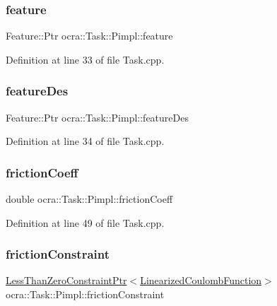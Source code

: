 \subsubsection{\texorpdfstring{feature}{feature}}
{\footnotesize\ttfamily Feature\+::\+Ptr ocra\+::\+Task\+::\+Pimpl\+::feature}



Definition at line 33 of file Task.\+cpp.

\hypertarget{structocra_1_1Task_1_1Pimpl_aeaa68d51952ea53355e2f8789b691174}{}\label{structocra_1_1Task_1_1Pimpl_aeaa68d51952ea53355e2f8789b691174} 
\subsubsection{\texorpdfstring{feature\+Des}{featureDes}}
{\footnotesize\ttfamily Feature\+::\+Ptr ocra\+::\+Task\+::\+Pimpl\+::feature\+Des}



Definition at line 34 of file Task.\+cpp.

\hypertarget{structocra_1_1Task_1_1Pimpl_ad241160e0a892b49ecee3ea6a4b68bca}{}\label{structocra_1_1Task_1_1Pimpl_ad241160e0a892b49ecee3ea6a4b68bca} 
\subsubsection{\texorpdfstring{friction\+Coeff}{frictionCoeff}}
{\footnotesize\ttfamily double ocra\+::\+Task\+::\+Pimpl\+::friction\+Coeff}



Definition at line 49 of file Task.\+cpp.

\hypertarget{structocra_1_1Task_1_1Pimpl_a311170ea86291b3d4fe9b9f1cd40e0a8}{}\label{structocra_1_1Task_1_1Pimpl_a311170ea86291b3d4fe9b9f1cd40e0a8} 
\subsubsection{\texorpdfstring{friction\+Constraint}{frictionConstraint}}
{\footnotesize\ttfamily \hyperlink{classocra_1_1LessThanZeroConstraintPtr}{Less\+Than\+Zero\+Constraint\+Ptr}$<$\hyperlink{classocra_1_1LinearizedCoulombFunction}{Linearized\+Coulomb\+Function}$>$ ocra\+::\+Task\+::\+Pimpl\+::friction\+Constraint}



